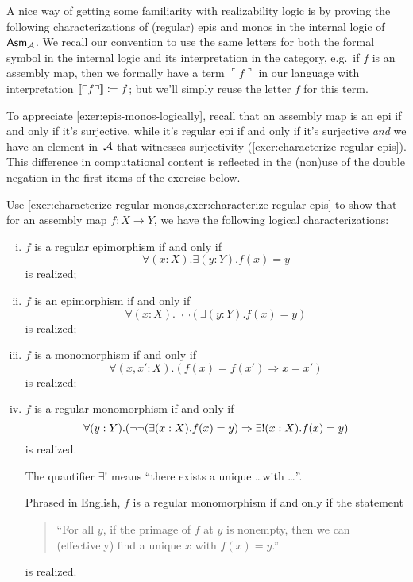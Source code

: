 A nice way of getting some familiarity with realizability logic is by proving
the following characterizations of (regular) epis and monos in the internal
logic of \(\Asm{\AA}\).
%
We recall our convention to use the same letters for both the formal
symbol in the internal logic and its interpretation in the category, e.g.\ if
\(f\) is an assembly map, then we formally have a term \(\ulcorner f \urcorner\) in
our language with interpretation \(\sem{\ulcorner f \urcorner} \coloneqq f\);
but we'll simply reuse the letter \(f\) for this term.

To appreciate \cref{exer:epis-monos-logically}, recall that an assembly map is
an epi if and only if it's surjective, while it's regular epi if and only if
it's surjective \emph{and} we have an element in~\(\AA\) that witnesses
surjectivity (\cref{exer:characterize-regular-epis}).
%
This difference in computational content is reflected in the (non)use of the
double negation in the first items of the exercise below.

\begin{exercise}\label{exer:epis-monos-logically}
  Use \cref{exer:characterize-regular-monos,exer:characterize-regular-epis} to
  show that for an assembly map \({f \colon X \to Y}\), we have the following
  logical characterizations:
  \begin{enumerate}[(i)]
  \item \(f\) is a regular epimorphism if and only if
    \[
      \forall(x : X).\exists(y : Y).f(x) = y
    \]
    is realized;
  \item \(f\) is an epimorphism if and only if
    \[
      \forall(x : X).\lnot\lnot({\exists(y : Y).f(x) = y})
    \]
    is realized;
  \item \(f\) is a monomorphism if and only if
    \[
      \forall(x, x' : X).(f(x) = f(x') \Rightarrow x = x')
    \]
    is realized;
  \item \(f\) is a regular monomorphism if and only if
    \[
      \forall(y : Y).\pa*{\lnot\lnot\pa*{\exists(x : X).f(x) = y} \Rightarrow \exists!(x : X).f(x) = y}
    \]
    is realized.

    The quantifier \(\exists!\) means ``there exists a unique \dots with \dots''.

    Phrased in English, \(f\) is a regular monomorphism if and only if the statement
    \begin{quote}{``For all \(y\), if the primage of \(f\) at \(y\) is nonempty,
        then we can (effectively) find a unique \(x\) with \(f(x) = y\).''}
    \end{quote}
    is realized.
  \end{enumerate}
\end{exercise}


